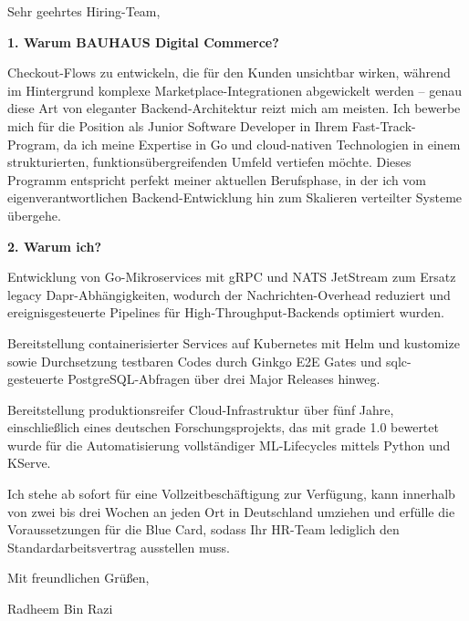 \documentclass[11pt,a4paper]{coverletter}
\begin{document}
\opening{Sehr geehrtes Hiring-Team,}

\vspace{8pt}\noindent\textbf{1. Warum BAUHAUS Digital Commerce?}\par\vspace{3pt}

Checkout-Flows zu entwickeln, die für den Kunden unsichtbar wirken, während im Hintergrund komplexe Marketplace-Integrationen abgewickelt werden – genau diese Art von eleganter Backend-Architektur reizt mich am meisten. Ich bewerbe mich für die Position als Junior Software Developer in Ihrem Fast-Track-Program, da ich meine Expertise in Go und cloud-nativen Technologien in einem strukturierten, funktionsübergreifenden Umfeld vertiefen möchte. Dieses Programm entspricht perfekt meiner aktuellen Berufsphase, in der ich vom eigenverantwortlichen Backend-Entwicklung hin zum Skalieren verteilter Systeme übergehe.

\vspace{8pt}\noindent\textbf{2. Warum ich?}\par\vspace{3pt}

\bullets

  \item Entwicklung von Go-Mikroservices mit gRPC und NATS JetStream zum Ersatz legacy Dapr-Abhängigkeiten, wodurch der Nachrichten-Overhead reduziert und ereignisgesteuerte Pipelines für High-Throughput-Backends optimiert wurden.

  \item Bereitstellung containerisierter Services auf Kubernetes mit Helm und kustomize sowie Durchsetzung testbaren Codes durch Ginkgo E2E Gates und sqlc-gesteuerte PostgreSQL-Abfragen über drei Major Releases hinweg.

  \item Bereitstellung produktionsreifer Cloud-Infrastruktur über fünf Jahre, einschließlich eines deutschen Forschungsprojekts, das mit grade 1.0 bewertet wurde für die Automatisierung vollständiger ML-Lifecycles mittels Python und KServe.

\bulletsend

Ich stehe ab sofort für eine Vollzeitbeschäftigung zur Verfügung, kann innerhalb von zwei bis drei Wochen an jeden Ort in Deutschland umziehen und erfülle die Voraussetzungen für die Blue Card, sodass Ihr HR-Team lediglich den Standardarbeitsvertrag ausstellen muss.

\closing{Mit freundlichen Grüßen,}{Radheem Bin Razi}
\end{document}
